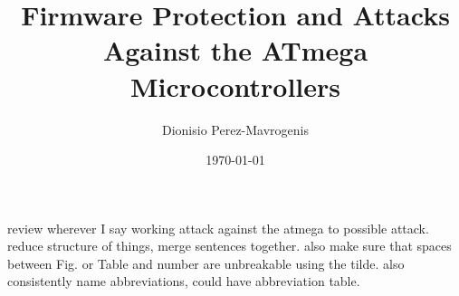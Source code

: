 \documentclass[10pt,journal,compsoc, a4paper]{IEEEtran}
\author{Dionisio Perez-Mavrogenis}
\title{Firmware Protection and Attacks Against the ATmega Microcontrollers}
\date{\today}
\begin{document}
\maketitle
\IEEEdisplaynotcompsoctitleabstractindextext

{\color{red} review wherever I say working attack against the atmega to possible attack. reduce structure of things, merge sentences together. also make sure that spaces between Fig. or Table and number are unbreakable using the tilde. also consistently name abbreviations, could have abbreviation table.}


	



	

{\footnotesize 	} %
\end{document}
